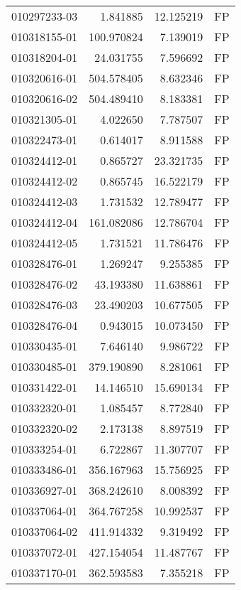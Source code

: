 \begin{tabular}{lrrl}
010297233-03 &    1.841885 &      12.125219 &   FP \\
010318155-01 &  100.970824 &       7.139019 &   FP \\
010318204-01 &   24.031755 &       7.596692 &   FP \\
010320616-01 &  504.578405 &       8.632346 &   FP \\
010320616-02 &  504.489410 &       8.183381 &   FP \\
010321305-01 &    4.022650 &       7.787507 &   FP \\
010322473-01 &    0.614017 &       8.911588 &   FP \\
010324412-01 &    0.865727 &      23.321735 &   FP \\
010324412-02 &    0.865745 &      16.522179 &   FP \\
010324412-03 &    1.731532 &      12.789477 &   FP \\
010324412-04 &  161.082086 &      12.786704 &   FP \\
010324412-05 &    1.731521 &      11.786476 &   FP \\
010328476-01 &    1.269247 &       9.255385 &   FP \\
010328476-02 &   43.193380 &      11.638861 &   FP \\
010328476-03 &   23.490203 &      10.677505 &   FP \\
010328476-04 &    0.943015 &      10.073450 &   FP \\
010330435-01 &    7.646140 &       9.986722 &   FP \\
010330485-01 &  379.190890 &       8.281061 &   FP \\
010331422-01 &   14.146510 &      15.690134 &   FP \\
010332320-01 &    1.085457 &       8.772840 &   FP \\
010332320-02 &    2.173138 &       8.897519 &   FP \\
010333254-01 &    6.722867 &      11.307707 &   FP \\
010333486-01 &  356.167963 &      15.756925 &   FP \\
010336927-01 &  368.242610 &       8.008392 &   FP \\
010337064-01 &  364.767258 &      10.992537 &   FP \\
010337064-02 &  411.914332 &       9.319492 &   FP \\
010337072-01 &  427.154054 &      11.487767 &   FP \\
010337170-01 &  362.593583 &       7.355218 &   FP \\

\end{tabular}
